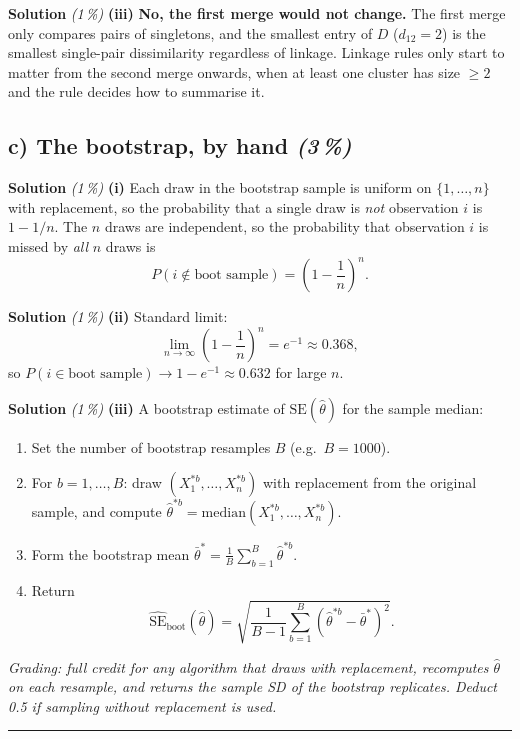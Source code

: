 \documentclass[11pt,a4paper]{article}
\newcommand{\subpoints}[1]{\textit{(#1\,\%)}}
\newcommand{\sol}{\noindent\textbf{Solution}}
\begin{document}
\medskip
\sol{} \subpoints{1} \textbf{(iii)} \textbf{No, the first merge would not change.} The first merge only
compares pairs of singletons, and the smallest entry of $D$ ($d_{12}=2$) is the smallest single-pair
dissimilarity regardless of linkage. Linkage rules only start to matter from the second merge onwards,
when at least one cluster has size $\geq 2$ and the rule decides how to summarise it.

\subsection*{c) The bootstrap, by hand \subpoints{3}}

\sol{} \subpoints{1} \textbf{(i)} Each draw in the bootstrap sample is uniform on $\{1,\dots,n\}$ with
replacement, so the probability that a single draw is \emph{not} observation $i$ is $1-1/n$. The $n$ draws
are independent, so the probability that observation $i$ is missed by \emph{all} $n$ draws is
$$P(i\notin\text{boot sample}) = \left(1 - \frac{1}{n}\right)^n.$$

\medskip
\sol{} \subpoints{1} \textbf{(ii)} Standard limit:
$$\lim_{n\to\infty}\left(1-\frac{1}{n}\right)^n = e^{-1} \approx \boxed{0.368},$$
so $P(i\in\text{boot sample})\to 1 - e^{-1} \approx \boxed{0.632}$ for large $n$.

\medskip
\sol{} \subpoints{1} \textbf{(iii)} A bootstrap estimate of $\mathrm{SE}(\hat\theta)$ for the sample median:
\begin{enumerate}
  \item Set the number of bootstrap resamples $B$ (e.g.\ $B=1000$).
  \item For $b=1,\dots,B$: draw $(X_1^{*b},\dots,X_n^{*b})$ with replacement from the original sample, and
        compute $\hat\theta^{*b} = \mathrm{median}(X_1^{*b},\dots,X_n^{*b})$.
  \item Form the bootstrap mean $\bar\theta^* = \frac{1}{B}\sum_{b=1}^B\hat\theta^{*b}$.
  \item Return
        $$\widehat{\mathrm{SE}}_{\text{boot}}(\hat\theta) =
          \sqrt{\frac{1}{B-1}\sum_{b=1}^B\left(\hat\theta^{*b} - \bar\theta^*\right)^2}.$$
\end{enumerate}

\noindent\emph{Grading: full credit for any algorithm that draws with replacement, recomputes $\hat\theta$ on
each resample, and returns the sample SD of the bootstrap replicates. Deduct 0.5 if sampling without
replacement is used.}

\vspace{0.6em}
\hrule
\vspace{1em}
\end{document}
